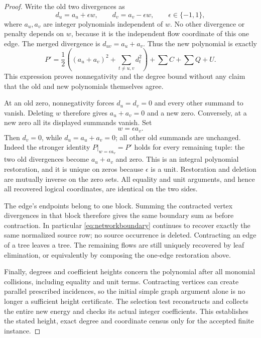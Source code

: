 \begin{proof}
Write the old two divergences as
\[
 d_u=a_u+\epsilon w,\qquad d_v=a_v-\epsilon w,
 \qquad \epsilon\in\{-1,1\},
\]
where $a_u,a_v$ are integer polynomials independent of $w$. No other
divergence or penalty depends on $w$, because it is the independent
flow coordinate of this one edge. The merged divergence is
$d_{uv}=a_u+a_v$. Thus the new polynomial is exactly
\[
 P'=\frac12\left((a_u+a_v)^2+
           \sum_{t\ne u,v}d_t^2\right)+\sum C+\sum Q+U.
\]
This expression proves nonnegativity and the degree bound without any
claim that the old and new polynomials themselves agree.

At an old zero, nonnegativity forces $d_u=d_v=0$ and every other
summand to vanish. Deleting $w$ therefore gives $a_u+a_v=0$ and a new
zero. Conversely, at a new zero all its displayed summands vanish.
Set
\[
 w=\epsilon a_v.
\]
Then $d_v=0$, while $d_u=a_u+a_v=0$; all other old summands are unchanged.
Indeed the stronger identity $P|_{w=\epsilon a_v}=P'$
holds for every remaining tuple: the two old divergences become
$a_u+a_v$ and zero. This is an integral polynomial restoration, and
it is unique on zeros because
$\epsilon$ is a unit. Restoration and deletion are mutually inverse on
the zero sets. All equality and unit arguments, and hence all recovered
logical coordinates, are identical on the two sides.

The edge's endpoints belong to one block. Summing the contracted
vertex divergences in that block therefore gives the same boundary sum
as before contraction. In particular \eqref{eq:networkboundary}
continues to recover exactly the same normalized source row; no source
occurrence is deleted. Contracting an edge of a tree leaves a tree.
The remaining flows are still uniquely recovered by leaf elimination,
or equivalently by composing the one-edge restoration above.

Finally, degrees and coefficient heights concern the polynomial after
all monomial collisions, including equality and unit terms. Contracting
vertices can create parallel prescribed incidences, so the initial simple
graph argument alone is no longer a sufficient height certificate. The
selection test reconstructs and collects the entire new energy and checks
its actual integer coefficients. This establishes the stated height,
exact degree and coordinate census only for the accepted finite instance.
\end{proof}

